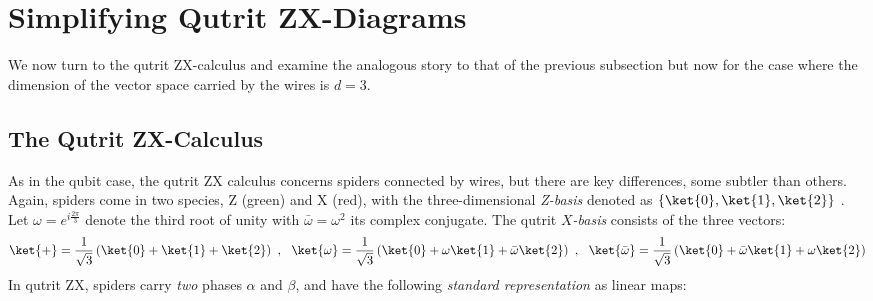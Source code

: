 \section{Simplifying Qutrit ZX-Diagrams}

We now turn to the qutrit ZX-calculus and examine the analogous story to that of the previous subsection
but now for the case where the dimension of the vector space carried by the wires is $d=3$.


\subsection{The Qutrit ZX-Calculus}


As in the qubit case, the qutrit ZX calculus concerns spiders connected by wires, but there are key differences, some subtler than others.
Again, spiders come in two species, Z (green) and X (red),
with the three-dimensional \emph{Z-basis} denoted as $\{\ket{0},\ket{1},\ket{2}\}$ .
Let $\omega = e^{i \frac{2\pi}{3}}$ denote the third root of unity
with $\bar\omega = \omega^2$ its complex conjugate.
The qutrit \emph{$X$-basis} consists of the three vectors: 
\begin{equation}
	\ket{+} = \frac{1}{\sqrt{3}} \left(\ket{0} + \ket{1} + \ket{2}\right)~,~~
	\ket{\omega} = \frac{1}{\sqrt{3}} \left(\ket{0} + \omega\ket{1} + \bar{\omega}\ket{2}\right)~,~~
	\ket{\bar{\omega}} = \frac{1}{\sqrt{3}} \left(\ket{0} + \bar{\omega}\ket{1} + \omega\ket{2}\right)
\end{equation}
In qutrit ZX,
spiders carry \emph{two} phases $\alpha$ and $\beta$,
and have the following \emph{standard representation} as linear maps:

